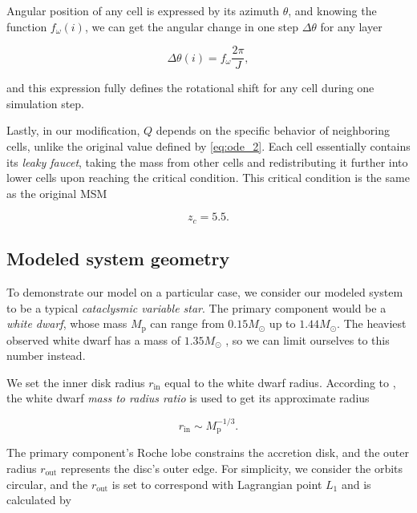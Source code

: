 Angular position of any cell is expressed by its azimuth $\theta$, and knowing the function $f_{\omega}(i)$, we can get the angular change in one step $\Delta \theta$ for any layer

\begin{equation}
	\Delta \theta (i) = f_{\omega} \frac{2 \pi}{J},
	\label{eq:delta_azimuth} 
\end{equation}

and this expression fully defines the rotational shift for any cell during one simulation step.

Lastly, in our modification, $Q$ depends on the specific behavior of neighboring cells, unlike the original value defined by \eqref{eq:ode_2}. Each cell essentially contains its \emph{leaky faucet}, taking the mass from other cells and redistributing it further into lower cells upon reaching the critical condition. This critical condition is the same as the original MSM

\begin{equation}
	z_c = 5.5.
	\label{eq:z_critical_model}
\end{equation}

\subsection{Modeled system geometry}

To demonstrate our model on a particular case, we consider our modeled system to be a typical \emph{cataclysmic variable star}. The primary component would be a \emph{white dwarf}, whose mass $M_{\text{p}}$ can range from $0.15 M_{\odot}$ up to $1.44 M_{\odot}$. The heaviest observed white dwarf has a mass of $1.35 M_{\odot}$ \cite{caiazzo2021}, so we can limit ourselves to this number instead.

We set the inner disk radius $r_{\text{in}}$ equal to the white dwarf radius. According to \cite{shapiro1983}, the white dwarf \emph{mass to radius ratio} is used to get its approximate radius

\begin{equation}
    r_{\text{in}} \sim M_{\text{p}}^{-1/3}.
\end{equation}

The primary component's Roche lobe constrains the accretion disk, and the outer radius $r_{\text{out}}$ represents the disc's outer edge. For simplicity, we consider the orbits circular, and the $r_{\text{out}}$ is set to correspond with Lagrangian point $L_1$ and is calculated by

